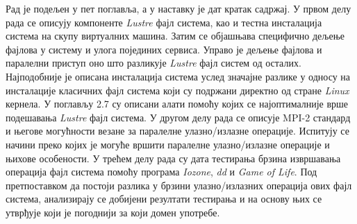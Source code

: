 Рад је подељен у пет поглавља, а у наставку је дат кратак садржај. У првом делу рада се описују компоненте \textit{Lustre} фајл система, као и тестна инсталација система на скупу виртуалних машина. Затим се објашњава специфично дељење фајлова у систему и улога појединих сервиса. Управо је дељење фајлова и паралелни приступ оно што разликује \textit{Lustre} фајл систем од осталих. Најподобније је описана инсталација система услед значајне разлике у односу на инсталације класичних фајл система који су подржани директно од стране \textit{Linux} кернела. У поглављу 2.7 су описани алати помоћу којих се  најоптималније врше подешавања \textit{Lustre} фајл система. 
У другом делу рада се описује MPI-2 стандард и његове могућности везане за паралелне улазно/излазне операције. Испитују се начини преко којих је могуће вршити паралелне улазно/излазне операције и њихове особености.
У трећем делу рада су дата тестирања брзина извршавања операција фајл система помоћу програма \textit{Iozone}, \textit{dd} и \textit{Game of Life}. Под претпоставком да постоји разлика у брзини улазно/излазних операција ових фајл система, анализирају се добијени резултати тестирања и на основу њих се утврђује који је погоднији за који домен употребе.

\newpage
